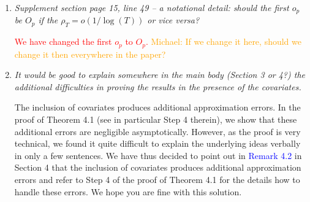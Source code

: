 \documentclass[a4paper,12pt]{article}
\begin{document}
\begin{enumerate}[label=\arabic*.,leftmargin=0.6cm]



\item \textit{Supplement section page 15, line 49 -- a notational detail: should the first $o_p$ be $O_p$ if the $\rho_T = o(1/ \log(T))$ or vice versa?}  

\textcolor{red}{We have changed the first $o_p$ to $O_p$.} \textcolor{orange}{Michael: If we change it here, should we change it then everywhere in the paper?}


\item \textit{It would be good to explain somewhere in the main body (Section 3 or 4?) the additional difficulties in proving the results in the presence of the covariates.}
  
The inclusion of covariates produces additional approximation errors. In the proof of Theorem 4.1 (see in particular Step 4 therein), we show that these additional errors are negligible asymptotically. However, as the proof is very technical, we found it quite difficult to explain the underlying ideas verbally in only a few sentences. We have thus decided to point out in \textcolor{blue}{Remark 4.2} in Section 4 that the inclusion of covariates produces additional approximation errors and refer to Step 4 of the proof of Theorem 4.1 for the details how to handle these errors. We hope you are fine with this solution.  
  
\end{enumerate}

\pagebreak

\vspace{10pt}

{\small
\setlength{\bibsep}{0.55em}
}
\end{document}
